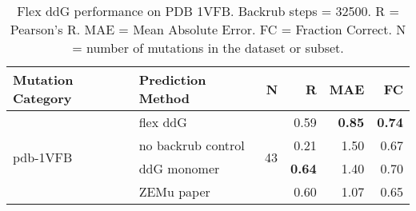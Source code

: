\begin{table}
  \begin{tabular}{llrrrr}
\toprule
Mutation Category &   Prediction Method &   N &    R &  MAE &   FC \\
\midrule
 \multirow{ 4}{*}{pdb-1VFB} & flex ddG & \multirow{ 4}{*}{43} & 0.59 & \textbf{0.85} & \textbf{0.74}  \\
 & no backrub control & & 0.21 & 1.50 & 0.67  \\
 & ddG monomer & & \textbf{0.64} & 1.40 & 0.70  \\
 & ZEMu paper & & 0.60 & 1.07 & 0.65  \\
\bottomrule
\end{tabular}
  \caption[Flex ddG performance on PDB 1VFB]{
    Flex ddG performance on PDB 1VFB. Backrub steps = 32500. R = Pearson's R. MAE = Mean Absolute Error. FC = Fraction Correct. N = number of mutations in the dataset or subset.
  } \label{tab:table-pdb-1VFB}
\end{table}
